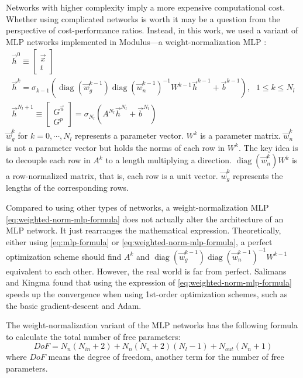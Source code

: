 Networks with higher complexity imply a more expensive computational cost.
Whether using complicated networks is worth it may be a question from the perspective of cost-performance ratios.
Instead, in this work, we used a variant of MLP networks implemented in Modulus---a weight-normalization MLP \cite{salimans_weight_2016}:
\begin{equation}\label{eq:weighted-norm-mlp-formula}
    \begin{array}{ll}
        \vec{h}^0 \equiv \begin{bmatrix} \vec{x} \\ t \end{bmatrix} & \\
        \vec{h}^k = \sigma_{k-1}\left(
            \operatorname{diag}\left(\vec{w}_g^{k-1}\right)
            \operatorname{diag}\left(\vec{w}_n^{k-1}\right)^{-1}
            W^{k-1}\vec{h}^{k-1}+\vec{b}^{k-1}
        \right)\text{,} & 1 \le k \le N_l \\
        \vec{h}^{N_l+1}\equiv \begin{bmatrix} G^{\vec{u}} \\ G^p \end{bmatrix} = \sigma_{N_l}\left(A^{N_l}\vec{h}^{N_l}+\vec{b}^{N_l}\right) &
    \end{array}
\end{equation}
$\vec{w}_g^{k}$ for $k=0,\cdots,N_l$ represents a parameter vector.
$W^k$ is a parameter matrix.
$\vec{w}_n^{k}$ is not a parameter vector but holds the norms of each row in $W^k$.
The key idea is to decouple each row in $A^k$ to a length multiplying a direction.
$\operatorname{diag}\left(\vec{w}_n^k\right)W^k$ is a row-normalized matrix, that is, each row is a unit vector.
$\vec{w}_g^k$ represents the lengths of the corresponding rows.

Compared to using other types of networks, a weight-normalization MLP \eqref{eq:weighted-norm-mlp-formula} does not actually alter the architecture of an MLP network.
It just rearranges the mathematical expression.
Theoretically, either using \eqref{eq:mlp-formula} or \eqref{eq:weighted-norm-mlp-formula}, a perfect optimization scheme should find $A^k$ and $\operatorname{diag}\left(\vec{w}_g^{k-1}\right) \operatorname{diag}\left(\vec{w}_n^{k-1}\right)^{-1} W^{k-1}$ equivalent to each other.
However, the real world is far from perfect.
Salimans and Kingma \cite{salimans_weight_2016} found that using the expression of \eqref{eq:weighted-norm-mlp-formula} speeds up the convergence when using 1st-order optimization schemes, such as the basic gradient-descent and Adam.

The weight-normalization variant of the MLP networks has the following formula to calculate the total number of free parameters:
\begin{equation}\label{eq:dof-calculator}
    DoF =
     N_{n} \left(N_{in} + 2\right) + 
    N_{n} \left(N_{n} + 2 \right) \left(N_l-1\right) +
     N_{out}\left(N_{n} + 1\right)
\end{equation}
where $DoF$ means the degree of freedom, another term for the number of free parameters.
